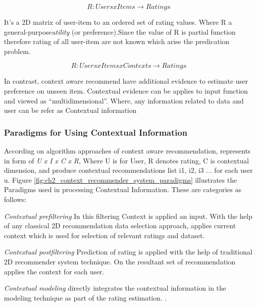 \begin{equation} 
R : Users x Items \rightarrow Ratings
\end{equation}

It’s a 2D matrix of user-item to an ordered set of rating values. Where R a general-purpose\textit{utility} (or preference).Since the value of R is partial function therefore rating of all user-item are not known which arise the predication problem.

\begin{equation} 
R : Users x Items x Contexts \rightarrow Ratings
\end{equation}

In contrast, context aware recommend have additional evidence to estimate user preference on unseen item. Contextual evidence can be applies to input function and viewed as “multidimensional”. Where, any information related to data and user can be refer as Contextual information

\subsubsection{Paradigms for Using Contextual Information}

According on algorithm approaches of context aware recommendation, represents in form of \textit{U x I x C x R}, Where U is for User, R denotes rating, C is contextual dimension, and produce contextual recommendations list i1, i2, i3 ... for each user u. Figure \ref{fig:ch2_context_recommender_system_paradigms} illustrates the Paradigms used in processing Contextual Information. These are categories as follows:\newline

\textit{Contextual prefiltering} In this filtering Context is applied an input. With the help of any classical 2D recommendation data selection approach, applies current context which is used for selection of relevant ratings and dataset.\newline

\textit{Contextual postfiltering} Prediction of rating is applied with the help of traditional 2D recommender system technique. On the resultant set of recommendation applies the context for each user. \newline

\textit{Contextual modeling} directly integrates the contextual information in the modeling technique as part of the rating estimation. .\newline


